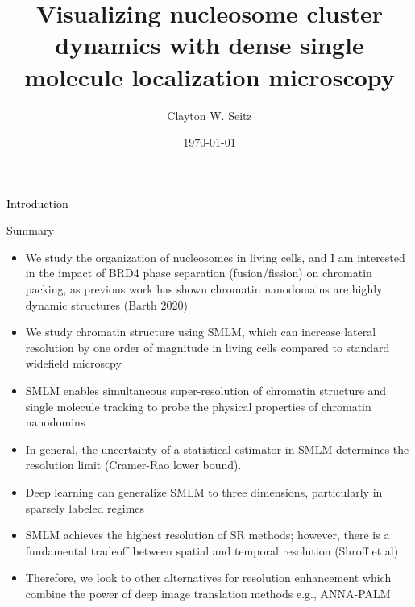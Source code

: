 \documentclass{beamer}					%
\title{Visualizing nucleosome cluster dynamics with dense single molecule localization microscopy}	%
\author{Clayton W. Seitz}								%
\date{\today}									%
\begin{document}
\begin{frame}
  \titlepage
\end{frame}


%


\begin{frame}
\frametitle{}
\centering
\Large \textcolor{black}{Introduction}
\end{frame}

\begin{frame}{Summary}
\begin{itemize}
\item We study the organization of nucleosomes in living cells, and I am interested in the impact of BRD4 phase separation (fusion/fission) on chromatin packing, as previous work has shown chromatin nanodomains are highly dynamic structures (Barth 2020)
\item We study chromatin structure using SMLM, which can increase lateral resolution by one order of magnitude in living cells compared to standard widefield microscpy
\item  SMLM enables simultaneous super-resolution of chromatin structure and single molecule tracking to probe the physical properties of chromatin nanodomins

\item In general, the uncertainty of a statistical estimator in SMLM determines the resolution limit (Cramer-Rao lower bound). \item Deep learning can generalize SMLM to three dimensions, particularly in sparsely labeled regimes

\item SMLM achieves the highest resolution of SR methods; however, there is a fundamental tradeoff between spatial and temporal resolution (Shroff et al)

\item Therefore, we look to other alternatives for resolution enhancement which combine the power of deep image translation methods e.g., ANNA-PALM
\end{itemize}
\end{frame}
\end{document}

